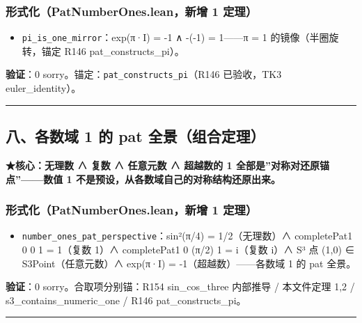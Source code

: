 \documentclass[
]{article}
\providecommand{\tightlist}{%
 \setlength{\itemsep}{0pt}\setlength{\parskip}{0pt}}
\begin{document}
\subsubsection{形式化（PatNumberOnes.lean，新增 1
定理）}\label{ux5f62ux5f0fux5316patnumberones.leanux65b0ux589e-1-ux5b9aux7406}

\begin{itemize}
\tightlist
\item
 \texttt{pi\_is\_one\_mirror}：exp(π·I) = -1 ∧ -(-1) = 1------π = 1
 的镜像（半圈旋转，锚定 R146 pat\_constructs\_pi）。
\end{itemize}

\textbf{验证}：0 sorry。锚定：\texttt{pat\_constructs\_pi}（R146
已验收，TK3 euler\_identity）。

\begin{center}\rule{0.5\linewidth}{0.5pt}\end{center}

\subsection{八、各数域 1 的 pat
全景（组合定理）}\label{ux516bux5404ux6570ux57df-1-ux7684-pat-ux5168ux666fux7ec4ux5408ux5b9aux7406}

\textbf{★核心：无理数 ∧ 复数 ∧ 任意元数 ∧ 超越数的 1
全部是''对称对还原锚点''------数值 1
不是预设，从各数域自己的对称结构还原出来。}

\subsubsection{形式化（PatNumberOnes.lean，新增 1
定理）}\label{ux5f62ux5f0fux5316patnumberones.leanux65b0ux589e-1-ux5b9aux7406-1}

\begin{itemize}
\tightlist
\item
 \texttt{number\_ones\_pat\_perspective}：sin²(π/4) = 1/2（无理数）∧
 completePat1 0 0 1 = 1（复数 1）∧ completePat1 0 (π/2) 1 = i（复数
 i）∧ S³ 点 (1,0) ∈ S3Point（任意元数）∧ exp(π·I) =
 -1（超越数）------各数域 1 的 pat 全景。
\end{itemize}

\textbf{验证}：0 sorry。合取项分别锚：R154 sin\_cos\_three 内部推导 /
本文件定理 1,2 / s3\_contains\_numeric\_one / R146 pat\_constructs\_pi。

\begin{center}\rule{0.5\linewidth}{0.5pt}\end{center}
\end{document}
